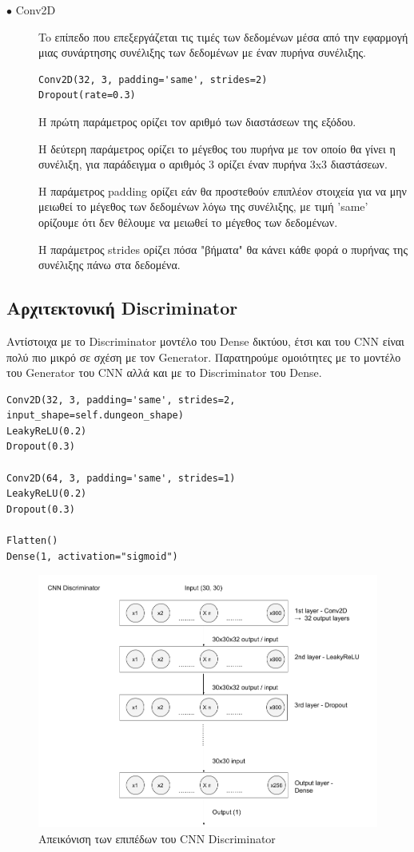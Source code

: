 \begin{description}
\item[$\bullet$ Conv2D] To επίπεδο που επεξεργάζεται τις τιμές των δεδομένων μέσα από την εφαρμογή μιας συνάρτησης συνέλιξης των δεδομένων με έναν πυρήνα συνέλιξης. \cite{conv2d}
\par
\begin{verbatim}
Conv2D(32, 3, padding='same', strides=2)
Dropout(rate=0.3)
\end{verbatim}
\par
Η πρώτη παράμετρος ορίζει τον αριθμό των διαστάσεων της εξόδου.
\par
Η δεύτερη παράμετρος ορίζει το μέγεθος του πυρήνα με τον οποίο θα γίνει η συνέλιξη, για παράδειγμα ο αριθμός 3 ορίζει έναν πυρήνα 3x3 διαστάσεων.
\par
H παράμετρος padding ορίζει εάν θα προστεθούν επιπλέον στοιχεία για να μην μειωθεί το μέγεθος των δεδομένων λόγω της συνέλιξης, με τιμή 'same' ορίζουμε ότι δεν θέλουμε να μειωθεί το μέγεθος των δεδομένων.
\par
H παράμετρος strides ορίζει πόσα "βήματα" θα κάνει κάθε φορά ο πυρήνας της συνέλιξης πάνω στα δεδομένα.
\end{description}


\subsection{Αρχιτεκτονική Discriminator}
Αντίστοιχα με το Discriminator μοντέλο του Dense δικτύου, έτσι και του CNN είναι πολύ πιο μικρό σε σχέση με τον Generator. Παρατηρούμε ομοιότητες με το μοντέλο του Generator του CNN αλλά και με το Discriminator του Dense.

\begin{verbatim}
Conv2D(32, 3, padding='same', strides=2, input_shape=self.dungeon_shape)
LeakyReLU(0.2)
Dropout(0.3)

Conv2D(64, 3, padding='same', strides=1)
LeakyReLU(0.2)
Dropout(0.3)

Flatten()
Dense(1, activation="sigmoid")

\end{verbatim}

\begin{figure}[H]
\centering
\includegraphics[width=.8\linewidth]{../images/graphs/CNN_discriminator.png}
\caption{Απεικόνιση των επιπέδων του CNN Discriminator}
\label{fig:fig}
\end{figure}

